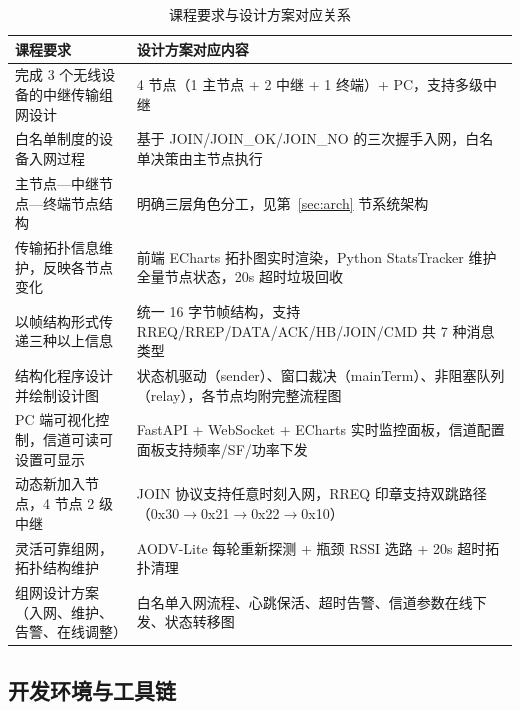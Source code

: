 \documentclass[12pt,a4paper]{ctexart}
\newcommand{\tblheaderstyle}{\sffamily\small\color{white}}
\begin{document}
\begin{table}[htbp]
\centering
\caption{课程要求与设计方案对应关系}
\label{tab:requirements}
\begin{tabularx}{\textwidth}{p{4.8cm}X}
\toprule
\rowcolor{tblhead}\tblheaderstyle 课程要求 & \tblheaderstyle 设计方案对应内容 \\
\midrule
完成 3 个无线设备的中继传输组网设计 &
4 节点（1 主节点 + 2 中继 + 1 终端）+ PC，支持多级中继 \\

白名单制度的设备入网过程 &
基于 JOIN/JOIN\_OK/JOIN\_NO 的三次握手入网，白名单决策由主节点执行 \\

主节点—中继节点—终端节点结构 &
明确三层角色分工，见第~\ref{sec:arch} 节系统架构 \\

传输拓扑信息维护，反映各节点变化 &
前端 ECharts 拓扑图实时渲染，Python StatsTracker 维护全量节点状态，20s 超时垃圾回收 \\

以帧结构形式传递三种以上信息 &
统一 16 字节帧结构，支持 RREQ/RREP/DATA/ACK/HB/JOIN/CMD 共 7 种消息类型 \\

结构化程序设计并绘制设计图 &
状态机驱动（sender）、窗口裁决（mainTerm）、非阻塞队列（relay），各节点均附完整流程图 \\

PC 端可视化控制，信道可读可设置可显示 &
FastAPI + WebSocket + ECharts 实时监控面板，信道配置面板支持频率/SF/功率下发 \\

动态新加入节点，4 节点 2 级中继 &
JOIN 协议支持任意时刻入网，RREQ 印章支持双跳路径（0x30$\to$0x21$\to$0x22$\to$0x10） \\

灵活可靠组网，拓扑结构维护 &
AODV-Lite 每轮重新探测 + 瓶颈 RSSI 选路 + 20s 超时拓扑清理 \\

组网设计方案（入网、维护、告警、在线调整） &
白名单入网流程、心跳保活、超时告警、信道参数在线下发、状态转移图 \\
\bottomrule
\end{tabularx}
\end{table}

\subsection{开发环境与工具链}
\end{document}
